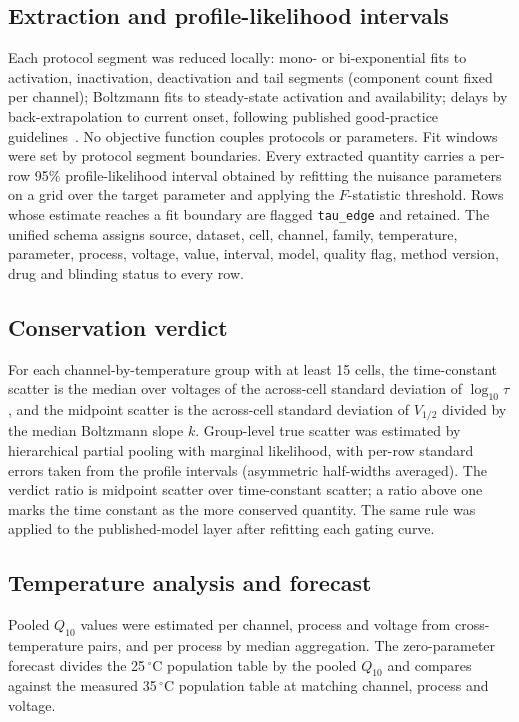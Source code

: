 \documentclass[11pt,a4paper]{article}
\begin{document}
\subsection{Extraction and profile-likelihood intervals}

Each protocol segment was reduced locally: mono- or bi-exponential fits to
activation, inactivation, deactivation and tail segments (component count fixed
per channel); Boltzmann fits to steady-state activation and availability; delays
by back-extrapolation to current onset, following published good-practice
guidelines~\cite{Montnach2021}. No objective function couples protocols
or parameters. Fit windows were set by protocol segment boundaries. Every
extracted quantity carries a per-row 95\% profile-likelihood interval obtained by
refitting the nuisance parameters on a grid over the target parameter and
applying the $F$-statistic threshold. Rows whose estimate reaches a fit boundary
are flagged \texttt{tau\_edge} and retained. The unified schema assigns source,
dataset, cell, channel, family, temperature, parameter, process, voltage, value,
interval, model, quality flag, method version, drug and blinding status to every
row.

\subsection{Conservation verdict}

For each channel-by-temperature group with at least 15 cells, the time-constant
scatter is the median over voltages of the across-cell standard deviation of
$\log_{10}\tau$, and the midpoint scatter is the across-cell standard deviation
of $V_{1/2}$ divided by the median Boltzmann slope $k$. Group-level true scatter
was estimated by hierarchical partial pooling with marginal likelihood, with
per-row standard errors taken from the profile intervals (asymmetric half-widths
averaged). The verdict ratio is midpoint scatter over time-constant scatter; a
ratio above one marks the time constant as the more conserved quantity. The same
rule was applied to the published-model layer after refitting each gating curve.

\subsection{Temperature analysis and forecast}

Pooled $Q_{10}$ values were estimated per channel, process and voltage from
cross-temperature pairs, and per process by median aggregation. The
zero-parameter forecast divides the 25\,$^\circ$C population table by the pooled
$Q_{10}$ and compares against the measured 35\,$^\circ$C population table at
matching channel, process and voltage.
\end{document}
